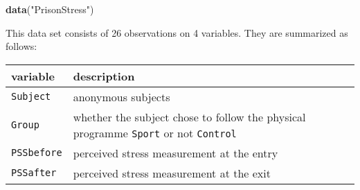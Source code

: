\documentclass[]{article}
\newenvironment{Shaded}{\begin{snugshade}}{\end{snugshade}}
\newcommand{\KeywordTok}[1]{\textcolor[rgb]{0.13,0.29,0.53}{\textbf{#1}}}
\newcommand{\StringTok}[1]{\textcolor[rgb]{0.31,0.60,0.02}{#1}}
\newcommand{\NormalTok}[1]{#1}
\begin{document}
\begin{Shaded}
\begin{Highlighting}[]
\KeywordTok{data}\NormalTok{(}\StringTok{"PrisonStress"}\NormalTok{)}
\end{Highlighting}
\end{Shaded}

This data set consists of 26 observations on 4 variables. They are
summarized as follows:

\begin{longtable}[]{@{}ll@{}}
\toprule
\begin{minipage}[b]{0.17\columnwidth}\raggedright\strut
variable\strut
\end{minipage} & \begin{minipage}[b]{0.71\columnwidth}\raggedright\strut
description\strut
\end{minipage}\tabularnewline
\midrule
\endhead
\begin{minipage}[t]{0.17\columnwidth}\raggedright\strut
\texttt{Subject}\strut
\end{minipage} & \begin{minipage}[t]{0.71\columnwidth}\raggedright\strut
anonymous subjects\strut
\end{minipage}\tabularnewline
\begin{minipage}[t]{0.17\columnwidth}\raggedright\strut
\texttt{Group}\strut
\end{minipage} & \begin{minipage}[t]{0.71\columnwidth}\raggedright\strut
whether the subject chose to follow the physical programme
\texttt{Sport} or not \texttt{Control}\strut
\end{minipage}\tabularnewline
\begin{minipage}[t]{0.17\columnwidth}\raggedright\strut
\texttt{PSSbefore}\strut
\end{minipage} & \begin{minipage}[t]{0.71\columnwidth}\raggedright\strut
perceived stress measurement at the entry\strut
\end{minipage}\tabularnewline
\begin{minipage}[t]{0.17\columnwidth}\raggedright\strut
\texttt{PSSafter}\strut
\end{minipage} & \begin{minipage}[t]{0.71\columnwidth}\raggedright\strut
perceived stress measurement at the exit\strut
\end{minipage}\tabularnewline
\bottomrule
\end{longtable}
\end{document}
